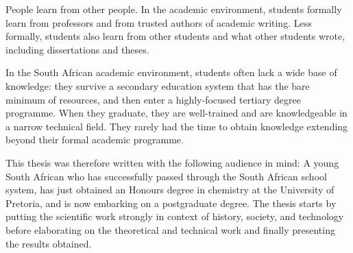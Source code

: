 \documentclass[
11pt, %
english, %
singlespacing, %
headsepline, %
]{MastersDoctoralThesis} %
\begin{document}

\begin{preface}
\addchaptertocentry{\prefacename}

People learn from other people. In the academic environment, students formally
learn from professors and from trusted authors of academic writing. Less
formally, students also learn from other students and what other students
wrote, including dissertations and theses.

In the South African academic environment, students often lack a wide base of
knowledge: they survive a secondary education system that has the bare minimum
of resources, and then enter a highly-focused tertiary degree programme. When
they graduate, they are well-trained and are knowledgeable in a narrow technical
field. They rarely had the time to obtain knowledge extending beyond their
formal academic programme.

This thesis was therefore written with the following audience in mind: A young
South African who has successfully passed through the South African school
system, has just obtained an Honours degree in chemistry at the University of
Pretoria, and is now embarking on a postgraduate degree. The thesis starts by
putting the scientific work strongly in context of history, society, and
technology before elaborating on the theoretical and technical work and finally
presenting the results obtained.

\end{preface}


\tableofcontents %

\listoffigures %

\listoftables %

\end{document}
